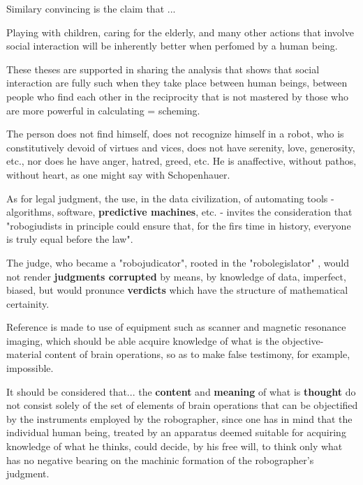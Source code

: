 Similary convincing is the claim that ...
\begin{claim}
    Playing with children, caring for the elderly, and many other actions that involve social interaction
    will be inherently better when perfomed by a human being.
\end{claim}

These theses are supported in sharing the analysis that shows that social interaction are fully such when 
they take place between human beings, between people who find each other in the reciprocity that is not
mastered by those who are more powerful in calculating = scheming.

The person does not find himself, does not recognize himself in a robot, who is constitutively devoid
of virtues and vices, does not have serenity, love, generosity, etc., nor does he have anger, hatred, greed, etc. 
He is anaffective, without pathos, without heart, as one might say with Schopenhauer.

As for legal judgment, the use, in the data civilization, of automating tools - algorithms, software, 
\textbf{predictive machines}, etc. - invites the consideration that "robogiudists in principle could ensure
that, for the firs time in history, everyone is truly equal before the law".

The judge, who became a "robojudicator",  rooted in the "robolegislator"
, would not render \textbf{judgments corrupted} by means, by knowledge of data, imperfect, biased, but would
pronunce \textbf{verdicts} which have the structure of mathematical certainity.

\begin{example}
    Reference is made to use of equipment such as scanner and magnetic resonance imaging, which should
    be able acquire knowledge of what is the objective-material content of brain operations, so as to make
    false testimony, for example, impossible.
\end{example}

It should be considered that... the \textbf{content} and \textbf{meaning} of what is \textbf{thought} do not
consist solely of the set of elements of brain operations that can be objectified by the instruments employed
by the robographer, since one has in mind that the individual human being, treated by an apparatus deemed suitable
for acquiring knowledge of what he thinks, could decide, by his free will, to think only what has no negative
bearing on the machinic formation of the robographer's judgment.

